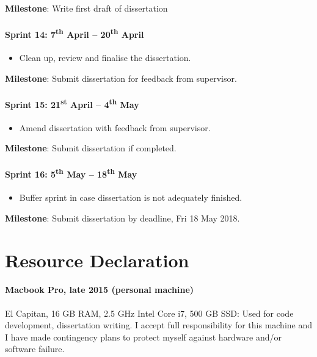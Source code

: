\documentclass[12pt,a4paper]{book}
\begin{document}
\textbf{Milestone}: Write first draft of dissertation

\paragraph{Sprint 14: 7\textsuperscript{th} April -- 20\textsuperscript{th} April}
\begin{itemize}
\item Clean up, review and finalise the dissertation.
\end{itemize}

\textbf{Milestone}: Submit dissertation for feedback from supervisor.

\paragraph{Sprint 15: 21\textsuperscript{st} April -- 4\textsuperscript{th} May}
\begin{itemize}
\item Amend dissertation with feedback from supervisor.
\end{itemize}

\textbf{Milestone}: Submit dissertation if completed.

\paragraph{Sprint 16: 5\textsuperscript{th} May -- 18\textsuperscript{th} May}
\begin{itemize}
\item Buffer sprint in case dissertation is not adequately finished.
\end{itemize}

\textbf{Milestone}: Submit dissertation by deadline, Fri 18 May 2018.


\section*{Resource Declaration}

\paragraph{Macbook Pro, late 2015 (personal machine)} El Capitan, 16 GB RAM, 2.5 GHz Intel Core i7, 500 GB SSD: Used for code development, dissertation writing. I accept full responsibility for this machine and I have made contingency plans to protect myself against hardware and/or software failure.
\end{document}
